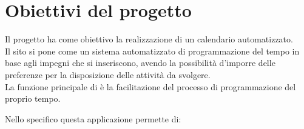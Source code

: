 \section{Obiettivi del progetto}
\label{sec:ObiettiviProgetto}
Il progetto ha come obiettivo la realizzazione di un calendario automatizzato.\\
Il sito si pone come un sistema automatizzato di programmazione del tempo in base agli impegni che si inseriscono, avendo la possibilità d'imporre delle preferenze per la disposizione delle attività da svolgere.\\
La funzione principale di \nome è la facilitazione del processo di programmazione del proprio tempo.

\vspace{0.5cm}

Nello specifico questa applicazione permette di:
